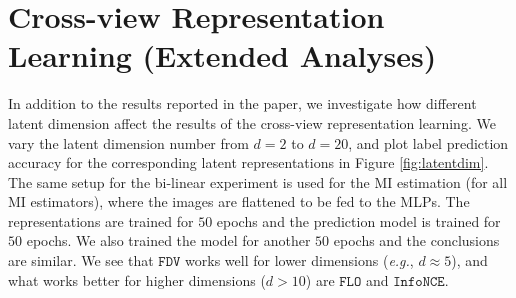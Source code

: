 \documentclass{article}
\theoremstyle{plain}
\theoremstyle{definition}
\theoremstyle{remark}
\newcommand{\infonce}{\texttt{InfoNCE}}
\newcommand{\FLO}{\texttt{FLO}}
\newcommand{\FDV}{\texttt{FDV}}
\begin{document}
			
			
			
			
			
			\section{Cross-view Representation Learning (Extended Analyses)}
			
			In addition to the results reported in the paper, we investigate how different latent dimension affect the results of the cross-view representation learning. We vary the latent dimension number from $d=2$ to $d=20$, and plot label prediction accuracy for the corresponding latent representations in Figure \ref{fig:latentdim}. The same setup for the bi-linear experiment is used for the MI estimation (for all MI estimators), where the images are flattened to be fed to the MLPs. The representations are trained for $50$ epochs and the prediction model is trained for $50$ epochs. We also trained the model for another $50$ epochs and the conclusions are similar. We see that $\FDV$ works well for lower dimensions ({\it e.g.}, $d\approx 5$), and what works better for higher dimensions ($d>10$) are $\FLO$ and $\infonce$. 
			
\end{document}
